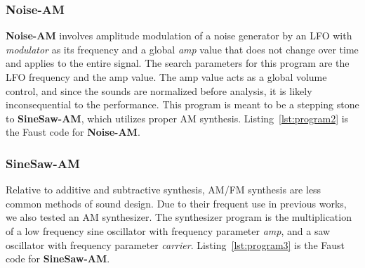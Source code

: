 \documentclass[lettersize,journal]{IEEEtran}
\newcommand{\AmpMod}{\textbf{Noise-AM}}
\newcommand{\FMMod}{\textbf{SineSaw-AM}}
\begin{document}
\subsubsection{\AmpMod}
\label{sec:program2}
\AmpMod{} involves amplitude modulation of a noise generator by an LFO with \textit{modulator} as its frequency and a global \textit{amp} value that does not change over time and applies to the entire signal. The search parameters for this program are the LFO frequency and the amp value. The amp value acts as a global volume control, and since the sounds are normalized before analysis, it is likely inconsequential to the performance. This program is meant to be a stepping stone to \FMMod, which utilizes proper AM synthesis. Listing~\ref{lst:program2} is the Faust code for \AmpMod. 

\subsubsection{\FMMod}
\label{sec:program3}
Relative to additive and subtractive synthesis, AM/FM synthesis are less common methods of sound design. Due to their frequent use in previous works, we also tested an AM synthesizer. The synthesizer program is the multiplication of a low frequency sine oscillator with frequency parameter \textit{amp}, and a saw oscillator with frequency parameter \textit{carrier}. Listing~\ref{lst:program3} is the Faust code for \FMMod. 
\end{document}

